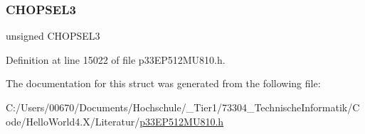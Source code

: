 \subsubsection{\texorpdfstring{C\+H\+O\+P\+S\+E\+L3}{CHOPSEL3}}
{\footnotesize\ttfamily unsigned C\+H\+O\+P\+S\+E\+L3}



Definition at line 15022 of file p33\+E\+P512\+M\+U810.\+h.



The documentation for this struct was generated from the following file\+:\begin{DoxyCompactItemize}
\item 
C\+:/\+Users/00670/\+Documents/\+Hochschule/\+\_\+\+Tier1/73304\+\_\+\+Technische\+Informatik/\+Code/\+Hello\+World4.\+X/\+Literatur/\hyperlink{p33_e_p512_m_u810_8h}{p33\+E\+P512\+M\+U810.\+h}\end{DoxyCompactItemize}
